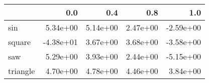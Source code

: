 \begin{tabular}{lrrrr}
\toprule
{} &       0.0 &      0.4 &      0.8 &       1.0 \\
\midrule
sin      &  5.34e+00 & 5.14e+00 & 2.47e+00 & -2.59e+00 \\
square   & -4.38e+01 & 3.67e+00 & 3.68e+00 & -3.58e+00 \\
saw      &  5.29e+00 & 3.93e+00 & 2.44e+00 & -5.15e+00 \\
triangle &  4.70e+00 & 4.78e+00 & 4.46e+00 &  3.84e+00 \\
\bottomrule
\end{tabular}
